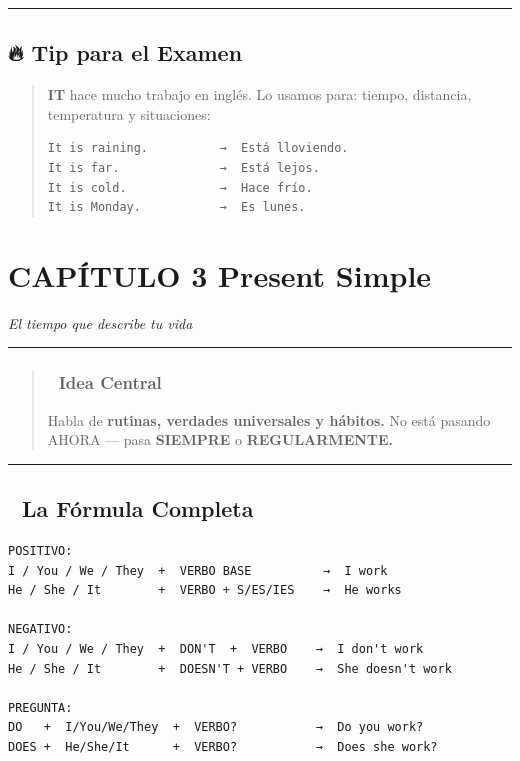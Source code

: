 \documentclass[
  spanish,
  letterpaper,
]{scrbook}
\begin{document}
\begin{center}\rule{0.5\linewidth}{0.5pt}\end{center}

\section{🔥 Tip para el Examen}\label{tip-para-el-examen}

\begin{quote}
\textbf{IT} hace mucho trabajo en inglés. Lo usamos para: tiempo,
distancia, temperatura y situaciones:

\begin{verbatim}
It is raining.          →  Está lloviendo.
It is far.              →  Está lejos.
It is cold.             →  Hace frío.
It is Monday.           →  Es lunes.
\end{verbatim}
\end{quote}

\chapter{CAPÍTULO 3 Present Simple}\label{capuxedtulo-3-present-simple}

\emph{El tiempo que describe tu vida}

\begin{center}\rule{0.5\linewidth}{0.5pt}\end{center}

\begin{quote}
\subsection{🎯 Idea Central}\label{idea-central-1}

Habla de \textbf{rutinas, verdades universales y hábitos.} No está
pasando AHORA --- pasa \textbf{SIEMPRE} o \textbf{REGULARMENTE.}
\end{quote}

\begin{center}\rule{0.5\linewidth}{0.5pt}\end{center}

\section{📐 La Fórmula Completa}\label{la-fuxf3rmula-completa}

\begin{verbatim}
POSITIVO:
I / You / We / They  +  VERBO BASE          →  I work
He / She / It        +  VERBO + S/ES/IES    →  He works

NEGATIVO:
I / You / We / They  +  DON'T  +  VERBO    →  I don't work
He / She / It        +  DOESN'T + VERBO    →  She doesn't work

PREGUNTA:
DO   +  I/You/We/They  +  VERBO?           →  Do you work?
DOES +  He/She/It      +  VERBO?           →  Does she work?
\end{verbatim}
\end{document}
